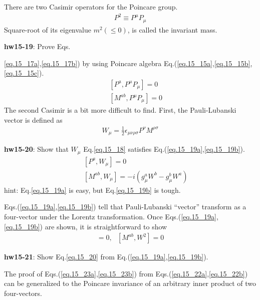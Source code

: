 \documentclass[12pt]{article}
\begin{document}
{  There are two Casimir operators for the Poincare group.
\begin{eqnarray}
  P^2 \equiv P^\mu P_\mu \label{eq.15_16}
\end{eqnarray}
  Square-root of its eigenvalue $m^2 (\leq0)$, is called the invariant mass.

{\bf hw15-19}: Prove Eqs.{\ref{eq.15_17a},\ref{eq.15_17b}) by using Poincare algebra Eq.(\ref{eq.15_15a},\ref{eq.15_15b},\ref{eq.15_15c}).
\begin{eqnarray}
  &&[ P^a,  P^\mu P_\mu ] = 0 \label{eq.15_17a} \\
  && [ M^{ab}, P^\mu P_\mu ] = 0 \label{eq.15_17b} 
\end{eqnarray}
  The second Casimir is a bit more difficult to find.
  First, the Pauli-Lubanski vector is defined as
\begin{eqnarray}
  W_\mu = \frac{1}{2} \epsilon_{\mu\nu\rho\sigma} P^\nu M^{\rho\sigma} \label{eq.15_18}
\end{eqnarray}

{\bf hw15-20}: Show that $W_\mu$ Eq.\ref{eq.15_18} satisfies Eq.(\ref{eq.15_19a},\ref{eq.15_19b}).
\begin{eqnarray}
  && [ P^a,  W_\mu ] = 0 \label{eq.15_19a} \\
  && [ M^{ab}, W_\mu ] = -i(g^a_\mu W^b - g^b_\mu W^a ) \label{eq.15_19b}
\end{eqnarray}
hint: Eq.\ref{eq.15_19a} is easy, but Eq.\ref{eq.15_19b} is tough.

Eqs.(\ref{eq.15_19a},\ref{eq.15_19b}) tell that Pauli-Lubanski ``vector'' transform as a four-vector under the Lorentz transformation.
Once Eqs.(\ref{eq.15_19a},\ref{eq.15_19b}) are shown, it is straightforward to show
\begin{eqnarray}
  [ P^a,  W^2 ] = 0, ~~~ [ M^{ab}, W^2 ] = 0 \label{eq.15_20}
\end{eqnarray}
 
{\bf hw15-21}: Show Eq.\ref{eq.15_20} from Eq.(\ref{eq.15_19a},\ref{eq.15_19b}).

  The proof of Eqs.(\ref{eq.15_23a},\ref{eq.15_23b}) from Eqs.(\ref{eq.15_22a},\ref{eq.15_22b}) can be generalized to the Poincare
  invariance of an arbitrary inner product of two four-vectors.

}}
\end{document}
